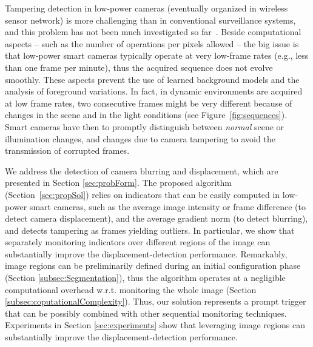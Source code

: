 \documentclass{llncs}
\begin{document}
Tampering detection in low-power cameras (eventually organized in wireless sensor network) is more challenging than in conventional surveillance systems, and this problem has not been much investigated so far~\cite{perrig2004security,alippi2010detecting}. Beside computational aspects -- such as the number of operations per pixels allowed -- the big issue is that low-power smart cameras typically operate at very low-frame rates (e.g., less than one frame per minute), thus the acquired sequence does not evolve smoothly. These aspects prevent the use of learned background models and the analysis of foreground variations. In fact, in dynamic environments are acquired at low frame rates, two consecutive frames might be very different because of changes in the scene and in the light conditions (see Figure~\ref{fig:sequences}). Smart cameras have then to promptly distinguish between \emph{normal} scene or illumination changes, and changes due to camera tampering to avoid the transmission of corrupted frames. %

We address the detection of camera blurring and displacement, which are presented in Section \ref{sec:probForm}. The proposed algorithm (Section~\ref{sec:propSol}) relies on indicators that can be easily computed in low-power smart cameras, such as the average image intensity or frame difference (to detect camera displacement), and the average gradient norm (to detect blurring), and detects tampering as frames yielding outliers. In particular, we show that separately monitoring indicators over different regions of the image can substantially improve the displacement-detection performance. Remarkably, image regions can be preliminarily defined during an initial configuration phase (Section \ref{subsec:Segmentation}), thus the algorithm operates at a negligible computational overhead w.r.t. monitoring the whole image (Section \ref{subsec:coputationalComplexity}). Thus, our solution represents a prompt trigger that can be possibly combined with other sequential monitoring techniques. Experiments in Section \ref{sec:experiments} show that leveraging image regions can substantially improve the displacement-detection performance. %
\end{document}
